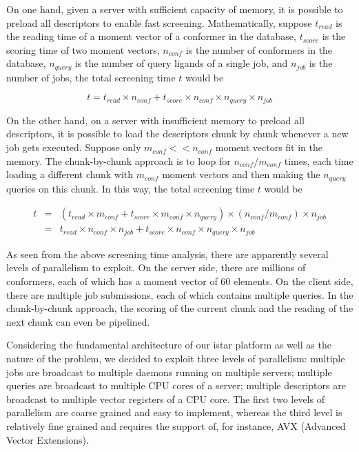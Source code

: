 On one hand, given a server with sufficient capacity of memory, it is possible to preload all descriptors to enable fast screening. Mathematically, suppose $t_{read}$ is the reading time of a moment vector of a conformer in the database, $t_{score}$ is the scoring time of two moment vectors, $n_{conf}$ is the number of conformers in the database, $n_{query}$ is the number of query ligands of a single job, and $n_{job}$ is the number of jobs, the total screening time $t$ would be

\begin{equation}
t=t_{read}\times n_{conf}+t_{score}\times n_{conf}\times n_{query}\times n_{job}
\label{usr:time0}
\end{equation}

On the other hand, on a server with insufficient memory to preload all descriptors, it is possible to load the descriptors chunk by chunk whenever a new job gets executed. Suppose only $m_{conf} << n_{conf}$ moment vectors fit in the memory. The chunk-by-chunk approach is to loop for $n_{conf}/m_{conf}$ times, each time loading a different chunk with $m_{conf}$ moment vectors and then making the $n_{query}$ queries on this chunk. In this way, the total screening time $t$ would be

\begin{eqnarray}
t&=&(t_{read}\times m_{conf}+t_{score}\times m_{conf}\times n_{query})\times(n_{conf}/m_{conf})\times n_{job}\nonumber\\
 &=&t_{read}\times n_{conf}\times n_{job}+t_{score}\times n_{conf}\times n_{query}\times n_{job}
\label{usr:time1}
\end{eqnarray}

As seen from the above screening time analysis, there are apparently several levels of parallelism to exploit. On the server side, there are millions of conformers, each of which has a moment vector of 60 elements. On the client side, there are multiple job submissions, each of which contains multiple queries. In the chunk-by-chunk approach, the scoring of the current chunk and the reading of the next chunk can even be pipelined.

Considering the fundamental architecture of our istar platform \citep{1362} as well as the nature of the problem, we decided to exploit three levels of parallelism: multiple jobs are broadcast to multiple daemons running on multiple servers; multiple queries are broadcast to multiple CPU cores of a server; multiple descriptors are broadcast to multiple vector registers of a CPU core. The first two levels of parallelism are coarse grained and easy to implement, whereas the third level is relatively fine grained and requires the support of, for instance, AVX (Advanced Vector Extensions).

